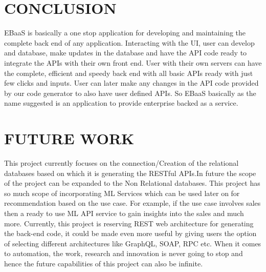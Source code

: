 \documentclass[letterpaper, 10 pt, conference]{ieeeconf}
\begin{document}
\section{CONCLUSION}
EBaaS is basically a one stop application for developing and maintaining the complete back end of any application. Interacting with the UI, user can develop and database, make updates in the database and have the API code ready to integrate the APIs with their own front end. User with their own servers can have the complete, efficient and speedy back end with all basic APIs ready with just few clicks and inputs. User can later make any changes in the API code provided by our code generator to also have user defined APIs. So EBaaS basically as the name suggested is an application to provide enterprise backed as a service.
\section{FUTURE WORK}
This project currently focuses on the connection/Creation of the relational databases based on which it is generating the RESTful APIs.In future the scope of the project can be expanded to the Non Relational databases. This project has so much scope of incorporating ML Services which can be used later on for recommendation based on the use case. For example, if the use case involves sales then a ready to use ML API service to gain insights into the sales and much more.
Currently, this project is reserving REST web architecture for generating the back-end code, it could be made even more useful by giving users the option of selecting different architectures like GraphQL, SOAP, RPC etc. When it comes to automation, the work, research and innovation is never going to stop and hence the future capabilities of this project can also be infinite. 
\end{document}
